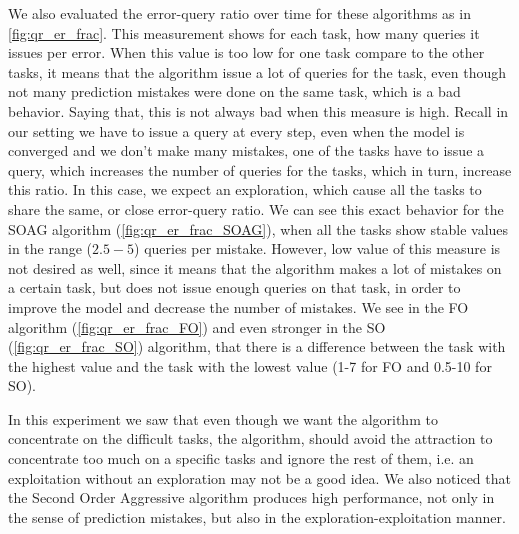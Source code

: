 We also evaluated the error-query ratio over time for these algorithms as in 
\eqref{fig:qr_er_frac}. This measurement shows for each task, how many queries 
it issues per error. When this value is too low for one task compare to the other tasks, it means that the algorithm 
issue a lot of queries for the task, even though not many prediction mistakes  
were done on the same task, which is a bad behavior. Saying that, this is not always bad when this 
measure is high. Recall in our setting we have to issue a query at every step, even when the model 
is converged and we don't make many mistakes, one of the tasks have to issue a query, which increases the 
number of queries for the tasks, which in turn, increase this ratio. In this case, we expect an 
exploration, which cause all the tasks to share 
the same, or close error-query ratio. We can see this exact behavior for the SOAG algorithm 
(\eqref{fig:qr_er_frac_SOAG}), when all the tasks show stable values in the 
range ($2.5-5$) queries per mistake. However, low value of this measure is not desired as well, since it 
means that the algorithm makes a lot of mistakes on a certain task, but does not 
issue enough queries on that task, in order to improve the model and decrease the number of 
mistakes. We see in the FO algorithm (\eqref{fig:qr_er_frac_FO}) and even stronger in the SO 
(\eqref{fig:qr_er_frac_SO}) algorithm, that there is a difference between the 
task with the highest value and the task with the lowest value (1-7 for FO and 0.5-10 for 
SO).

In this experiment we saw that even though we want the algorithm to concentrate on 
the difficult tasks, the algorithm, should avoid the attraction to concentrate too much on a specific 
tasks and ignore the rest of them, i.e. an exploitation without an exploration may not be a good 
idea. We also noticed that the Second Order Aggressive algorithm produces high 
performance, not only in the sense of prediction mistakes, but also in the 
exploration-exploitation manner.


